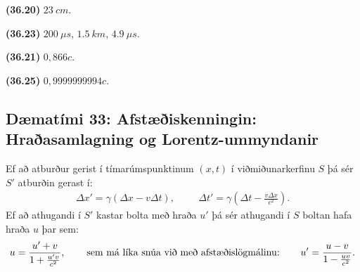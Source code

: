 \begin{tcolorbox}
\begin{enumerate*}[label = ]
  \item \textbf{(36.20)} $\SI{23}{cm}$.
  \item \textbf{(36.23)} $\SI{200}{\mu s}$, $\SI{1.5}{km}$, $\SI{4.9}{\mu s}$.
  \item \textbf{(36.21)} $0,866c$.
  \item \textbf{(36.25)} $0,9999999994c$.
\end{enumerate*}
\end{tcolorbox}

\newpage

\subsection*{Dæmatími 33: Afstæðiskenningin: Hraðasamlagning og Lorentz-ummyndanir}

\begin{tcolorbox}
Ef að atburður gerist í tímarúmspunktinum $(x,t)$ í viðmiðunarkerfinu $S$ þá sér $S'$ atburðin gerast í:
\begin{align*}
    \Delta x' = \gamma \left( \Delta x - v\Delta t \right), \hspace{1cm} \Delta t' = \gamma \left( \Delta t - \frac{v\Delta x}{c^2} \right).
\end{align*}
Ef að athugandi í $S'$ kastar bolta með hraða $u'$ þá sér athugandi í $S$ boltan hafa hraða $u$ þar sem:
\begin{align*}
    u = \frac{u' + v}{1 + \frac{u' v}{c^2}}, \hspace{0.75cm} \text{sem má líka snúa við með afstæðislögmálinu:} \hspace{0.75cm} u' = \frac{u-v}{1 - \frac{uv}{c^2}}. 
\end{align*}
\end{tcolorbox}


